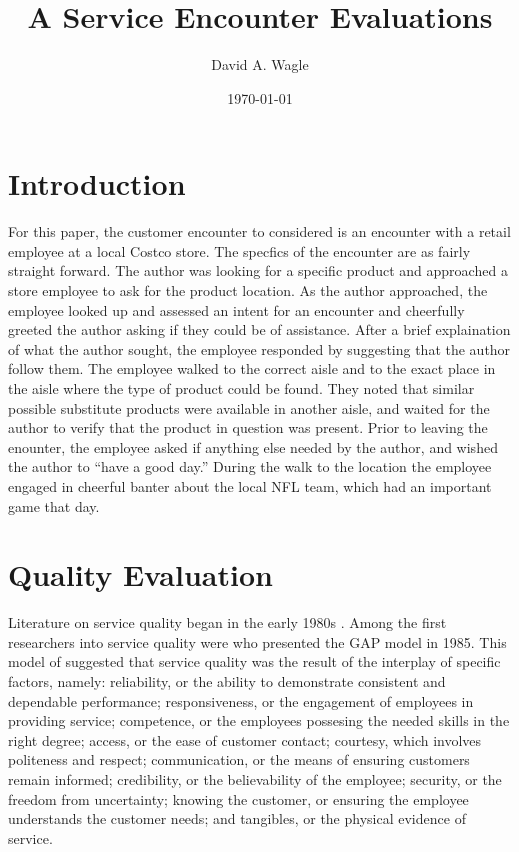 \documentclass[man]{apa7}
\affiliation{North Central University}
\author{David A. Wagle}
\date{\today}
\title{A Service Encounter Evaluations}
\begin{document}
\maketitle


\section{Introduction}
\label{sec:org38a0807}

For this paper, the customer encounter to considered is an encounter with a retail employee at a local Costco store. The specfics of the encounter are as fairly straight forward. The author was looking for a specific product and approached a store employee to ask for the product location. As the author approached, the employee looked up and assessed an intent for an encounter and cheerfully greeted the author asking if they could be of assistance. After a brief explaination of what the author sought, the employee responded by suggesting that the author follow them. The employee walked to the correct aisle and to the exact place in the aisle where the type of product could be found. They noted that similar possible substitute products were available in another aisle, and waited for the author to verify that the product in question was present. Prior to leaving the enounter, the employee asked if anything else needed by the author, and wished the author to ``have a good day.'' During the walk to the location the employee engaged in cheerful banter about the local NFL team, which had an important game that day.

\section{Quality Evaluation}
\label{sec:orgc5312a3}

Literature on service quality began in the early 1980s \parencite{hasanServiceQualityMeasurement2019}. Among the first researchers into service quality were \textcite{parasuramanConceptualModelService1985} who presented the GAP model in 1985. This model of suggested that service quality was the result of the interplay of specific factors, namely: reliability, or the ability to demonstrate consistent and dependable performance; responsiveness, or the engagement of employees in providing service; competence, or the employees possesing the needed skills in the right degree; access, or the ease of customer contact; courtesy, which involves politeness and respect; communication, or the means of ensuring customers remain informed; credibility, or the believability of the employee; security, or the freedom from uncertainty; knowing the customer, or ensuring the employee understands the customer needs; and tangibles, or the physical evidence of service.
\end{document}
